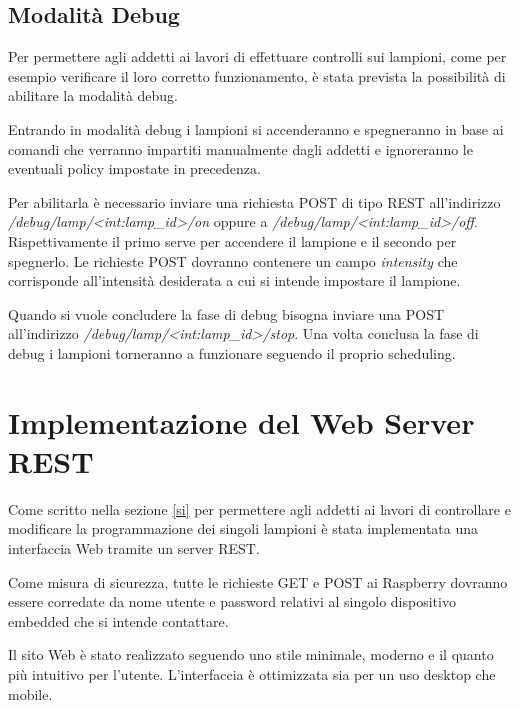 \subsection{Modalità Debug}

Per permettere agli addetti ai lavori di effettuare controlli sui lampioni, come per esempio verificare il loro corretto funzionamento, è stata prevista la possibilità di abilitare la modalità debug.

Entrando in modalità debug i lampioni si accenderanno e spegneranno in base ai comandi che verranno impartiti manualmente dagli addetti e ignoreranno le eventuali policy impostate in precedenza.

Per abilitarla è necessario inviare una richiesta POST di tipo REST all'indirizzo \textit{/debug/lamp/<int:lamp\_id>/on} oppure a \textit{/debug/lamp/<int:lamp\_id>/off}.
Rispettivamente il primo serve per accendere il lampione e il secondo per spegnerlo.
Le richieste POST dovranno contenere un campo \textit{intensity} che corrisponde all'intensità desiderata a cui si intende impostare il lampione.

Quando si vuole concludere la fase di debug bisogna inviare una POST all'indirizzo \textit{/debug/lamp/<int:lamp\_id>/stop}.
Una volta conclusa la fase di debug i lampioni torneranno a funzionare seguendo il proprio scheduling.

\section{Implementazione del Web Server REST}

Come scritto nella sezione \ref{si} per permettere agli addetti ai lavori di controllare e modificare la programmazione dei singoli lampioni è stata implementata una interfaccia Web tramite un server REST.

Come misura di sicurezza, tutte le richieste GET e POST ai Raspberry dovranno essere corredate da nome utente e password relativi al singolo dispositivo embedded che si intende contattare.

Il sito Web è stato realizzato seguendo uno stile minimale, moderno e il quanto più intuitivo per l'utente.
L'interfaccia è ottimizzata sia per un uso desktop che mobile.

